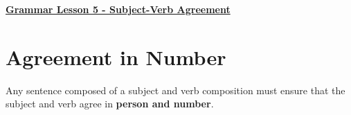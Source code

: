 \documentclass[12pt]{article} %
\begin{document}
	\renewcommand*{\coursecode}{MATH 235} %
	\renewcommand*{\assgnnumber}{Assignment 1} %
	\renewcommand*{\submdate}{September 14, 2021} %
	\renewcommand*{\studentfname}{Abdullah} %
	\renewcommand*{\studentlname}{Zubair} %
    \renewcommand*{\proofname}{Proof:}

	\renewcommand\qedsymbol{$\blacksquare$}
	\setfigpath
	\fancyhfoffset[L,O]{0pt} %




\begin{center}
  \textbf{\underline{\Huge{Grammar Lesson 5 - Subject-Verb Agreement}}}
\end{center}

\section{Agreement in Number}

Any sentence composed of a subject and verb composition must ensure that the subject and verb agree in \textbf{person and number}.

\end{document}
